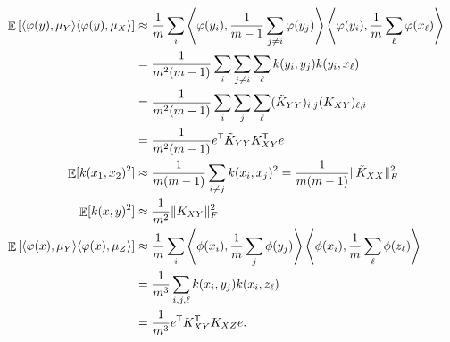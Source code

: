 \documentclass{article}
\DeclareMathOperator{\E}{\mathbb{E}}
\newcommand{\tp}{^\mathsf{T}}
\begin{document}
\begin{align*}
\\
\E\left[ \langle \varphi(y), \mu_Y \rangle \langle \varphi(y), \mu_X \rangle \right]
&\approx \frac1m \sum_i \left\langle \varphi(y_i), \frac{1}{m-1} \sum_{j \ne i} \varphi(y_j) \right\rangle \left\langle \varphi(y_i), \frac{1}{m} \sum_\ell \varphi(x_\ell) \right\rangle
\\&= \frac{1}{m^2 (m-1)} \sum_i \sum_{j \ne i} \sum_{\ell} k(y_i, y_j) k(y_i, x_\ell)
\\&= \frac{1}{m^2 (m-1)} \sum_i \sum_{j} \sum_{\ell} (\Ktyy)_{i,j} (\Kxy)_{\ell,i}
\\&= \frac{1}{m^2 (m-1)} e\tp \Ktyy \Kxy\tp e
\\
\E[ k(x_1, x_2)^2 ]
  &\approx \frac{1}{m (m-1)} \sum_{i \ne j} k(x_i, x_j)^2
  = \frac{1}{m (m-1)} \lVert \Ktxx \rVert_F^2
\\
\E[ k(x, y)^2 ] &\approx \frac{1}{m^2} \lVert \Kxy \rVert_F^2
\\
\E\left[ \langle \varphi(x), \mu_Y \rangle \langle \varphi(x), \mu_Z \rangle \right]
  &\approx \frac1m \sum_i \left\langle \phi(x_i), \frac1m \sum_j \phi(y_j) \right\rangle \left\langle \phi(x_i), \frac1m \sum_\ell \phi(z_\ell) \right\rangle
\\&= \frac{1}{m^3} \sum_{i,j,\ell} k(x_i, y_j) k(x_i, z_\ell)
\\&= \frac{1}{m^3} e\tp K_{XY}\tp K_{XZ} e
.\end{align*}
\endgroup


\printbibliography
\end{document}
